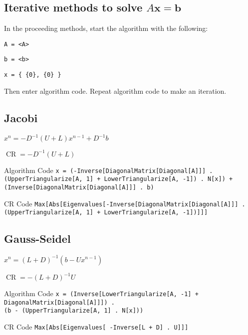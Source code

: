 \documentclass[10pt,letterpaper]{article}
\newenvironment{tight_item}
{\begin{itemize}
\setlength{\parskip}{0pt}
\setlength{\parsep}{0pt}
\setlength{\itemsep}{0pt}
\setlength{\parsep}{0pt}
\setlength{\topsep}{0pt}
\setlength{\partopsep}{0pt}
\setlength{\leftmargin}{0em}
\setlength{\labelwidth}{0em}
\setlength{\labelsep}{1em} }
{\end{itemize}}
\newenvironment{tight_enum}
{\begin{enumerate}
\setlength{\parskip}{0pt}
\setlength{\parsep}{0pt}
\setlength{\itemsep}{0pt}
\setlength{\parsep}{0pt}
\setlength{\topsep}{0pt}
\setlength{\partopsep}{0pt}
\setlength{\leftmargin}{0em}
\setlength{\labelwidth}{0em}
\setlength{\labelsep}{1em} }
{\end{enumerate}}
\newenvironment{tight_desc}
{\begin{description}
\setlength{\parskip}{0pt}
\setlength{\parsep}{0pt}
\setlength{\itemsep}{0pt}
\setlength{\parsep}{0pt}
\setlength{\topsep}{0pt}
\setlength{\partopsep}{0pt}
\setlength{\leftmargin}{0em}
\setlength{\labelwidth}{0em}
\setlength{\labelsep}{1em} }
{\end{description}}
\begin{document}
\begin{multicols*}{2}

\section{Iterative methods to solve $A\mathbf{x} = \mathbf{b}$}
In the proceeding methods, start the algorithm with the following:
\begin{tight_enum}
\item \texttt{A = <A>}
\item \texttt{b = <b>}
\item \texttt{x = \{ \{0\}, \{0\} \} }
\end{tight_enum}
Then enter algorithm code. Repeat algorithm code to make an iteration.

\subsection{Jacobi}
\begin{tight_item}
\item $x^{n} = -D^{-1}(U + L)x^{n-1}+ D^{-1}b$
\item $\operatorname{CR} = -D^{-1}(U+L)$
\end{tight_item}
\begin{tight_desc}
\item[Algorithm Code] \texttt{x = (-Inverse[DiagonalMatrix[Diagonal[A]]] .\\(UpperTriangularize[A, 1] + LowerTriangularize[A, -1]) . N[x]) +\\(Inverse[DiagonalMatrix[Diagonal[A]]] . b)}
\item[CR Code] \texttt{Max[Abs[Eigenvalues[-Inverse[DiagonalMatrix[Diagonal[A]]] .\\(UpperTriangularize[A, 1] + LowerTriangularize[A, -1])]]]}
\end{tight_desc}

\subsection{Gauss-Seidel}
\begin{tight_item}
\item $x^{n} = (L+D)^{-1}(b-Ux^{n-1})$
\item $\operatorname{CR} = -(L+D)^{-1}U$
\end{tight_item}
\begin{tight_desc}
\item[Algorithm Code] \texttt{x = (Inverse[LowerTriangularize[A, -1] +\\DiagonalMatrix[Diagonal[A]]]) .\\(b - (UpperTriangularize[A, 1] . N[x]))}
\item[CR Code] \texttt{Max[Abs[Eigenvalues[ -Inverse[L + D] . U]]]}
\end{tight_desc}


\end{multicols*}
\end{document}
